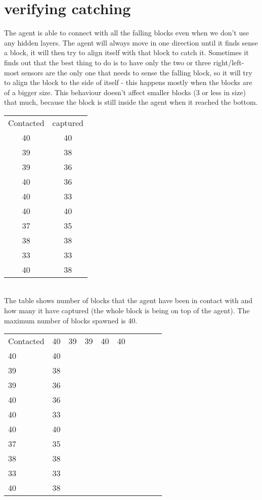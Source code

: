 \documentclass[12pt, a4paper]{article}
\begin{document}
\section{verifying catching}
The agent is able to connect with all the falling blocks even when we don't use any hidden layers. The agent will always move in one direction until it finds sense a block, it will then try to align itself with that block to catch it. Sometimes it finds out that the best thing to do is to have only the two or three right/left-most sensors are the only one that needs to sense the falling block, so it will try to align the block to the side of itself - this happens mostly when the blocks are of a bigger size. This behaviour doesn't affect smaller blocks (3 or less in size) that much, because the block is still inside the agent when it reached the bottom.\\
\begin{tabular}{c | c}
 Contacted& captured\\
40 &40 \\
39 &38\\
39 &36\\
40 &36\\
40 &33\\
40 &40\\
37 &35\\
38 &38\\
33 &33\\
40 &38\\
\end{tabular}\\
The table shows number of blocks that the agent have been in contact with and how many it have captured (the whole block is being on top of the agent). The maximum number of blocks spawned is 40.

\begin{tabular}{l | c | c |c |c |c |c |c |c|c}
 Contacted& 40&39&39&40&40\\
40 &40 \\
39 &38\\
39 &36\\
40 &36\\
40 &33\\
40 &40\\
37 &35\\
38 &38\\
33 &33\\
40 &38\\
\end{tabular}\\
\end{document}
